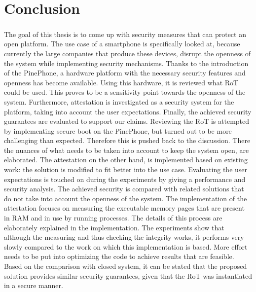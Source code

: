 \chapter{Conclusion}

\paragraph*{}
The goal of this thesis is to come up with security measures that can protect an open platform. The use case of a smartphone is specifically looked at, because currently the large companies that produce these devices, disrupt the openness of the system while implementing security mechanisms. Thanks to the introduction of the PinePhone, a hardware platform with the necessary security features and openness has become available. Using this hardware, it is reviewed what RoT could be used. This proves to be a sensitivity point towards the openness of the system. Furthermore, attestation is investigated as a security system for the platform, taking into account the user expectations. Finally, the achieved security guarantees are evaluated to support our claims. Reviewing the RoT is attempted by implementing secure boot on the PinePhone, but turned out to be more challenging than expected. Therefore this is pushed back to the discussion. There the nuances of what needs to be taken into account to keep the system open, are elaborated. The attestation on the other hand, is implemented based on existing work: the solution is modified to fit better into the use case. Evaluating the user expectations is touched on during the experiments by giving a performance and security analysis. The achieved security is compared with related solutions that do not take into account the openness of the system. The implementation of the attestation focuses on measuring the executable memory pages that are present in RAM and in use by running processes. The details of this process are elaborately explained in the implementation. The experiments show that although the measuring and thus checking the integrity works, it performs very slowly compared to the work on which this implementation is based. More effort needs to be put into optimizing the code to achieve results that are feasible. Based on the comparison with closed system, it can be stated that the proposed solution provides similar security guarantees, given that the RoT was instantiated in a secure manner.